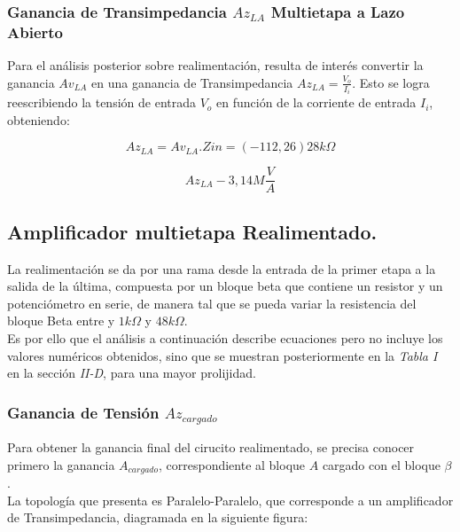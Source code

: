 \documentclass[letterpaper, 10 pt, conference]{ieeeconf}  %
\begin{document}
\subsubsection{Ganancia de Transimpedancia $Az_{LA}$ Multietapa a Lazo Abierto}

Para el análisis posterior sobre realimentación, resulta de interés convertir la ganancia $Av_{LA}$ en una ganancia de Transimpedancia $Az_{LA} =\frac{V_o}{I_i}$. Esto se logra reescribiendo la tensión de entrada $V_o$ en función de la corriente de entrada $I_i$, obteniendo:

\begin{equation}
Az_{LA} = Av_{LA} . Z{in} = (-112,26)28k\Omega
\end{equation}

\begin{equation}
Az_{LA}  -3,14M\frac{V}{A}
\end{equation}

\subsection{\textbf{Amplificador multietapa Realimentado.}}

La realimentación se da por una rama desde la entrada de la primer etapa a la salida de la última, compuesta por un bloque beta que contiene un resistor y un potenciómetro en serie, de manera tal que se pueda variar la resistencia del bloque Beta entre y $1k\Omega$ y $48k\Omega$.\\
Es por ello que el análisis a continuación describe ecuaciones pero no incluye los valores numéricos obtenidos, sino que se muestran posteriormente en la \textit{Tabla I} en la sección \textit{II-D}, para una mayor prolijidad.

\subsubsection{Ganancia de Tensión $Az_{cargado}$}

Para obtener la ganancia final del cirucito realimentado, se precisa conocer primero la ganancia $A_{cargado}$, correspondiente al bloque $A$ cargado con el bloque $\beta$.\\
La topología que presenta es Paralelo-Paralelo, que corresponde a un amplificador de Transimpedancia, diagramada en la siguiente figura:
\end{document}
